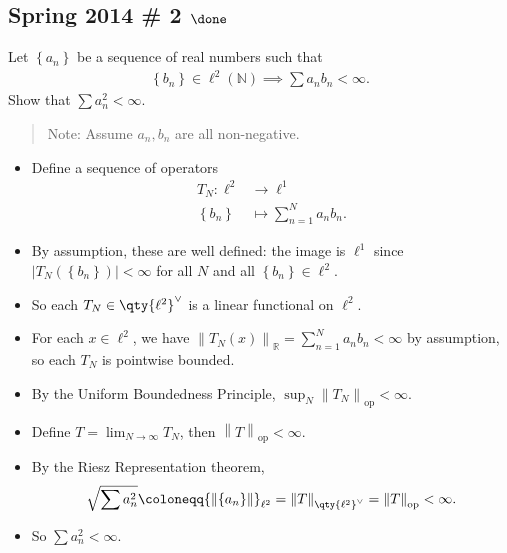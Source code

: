\hypertarget{spring-2014-2-done}{%
\subsection{\texorpdfstring{Spring 2014 \# 2
\(\done\)}{Spring 2014 \# 2 \textbackslash done}}\label{spring-2014-2-done}}

Let \(\left\{{a_n}\right\}\) be a sequence of real numbers such that
\begin{align*}
\left\{{b_n}\right\} \in \ell^2({\mathbb{N}}) \implies \sum a_n b_n < \infty.
\end{align*}
Show that \(\sum a_n^2 < \infty\).

\begin{quote}
Note: Assume \(a_n, b_n\) are all non-negative.
\end{quote}


\begin{solution}

\envlist

\begin{itemize}
\item
  Define a sequence of operators
  \begin{align*}  
  T_N: \ell^2 &\to \ell^1\\
  \left\{{b_n}\right\} &\mapsto \sum_{n=1}^N a_n b_n
  .\end{align*}
\item
  By assumption, these are well defined: the image is \(\ell^1\) since
  \({\left\lvert {T_N(\left\{{b_n}\right\})} \right\rvert} < \infty\)
  for all \(N\) and all \(\left\{{b_n}\right\} \in \ell^2\).
\item
  So each \(T_N \in \qty{\ell^2}^\vee\) is a linear functional on
  \(\ell^2\).
\item
  For each \(x\in \ell^2\), we have
  \({\left\lVert {T_N(x)} \right\rVert}_{{\mathbb{R}}} = \sum_{n=1}^N a_n b_n < \infty\)
  by assumption, so each \(T_N\) is pointwise bounded.
\item
  By the Uniform Boundedness Principle,
  \(\sup_N {\left\lVert {T_N} \right\rVert}_{\text{op}} < \infty\).
\item
  Define \(T = \lim_{N \to\infty } T_N\), then
  \({\left\lVert {T} \right\rVert}_{\text{op}} < \infty\).
\item
  By the Riesz Representation theorem,
  \begin{align*}  
  \sqrt{\sum a_n^2} \coloneqq{\left\lVert {\left\{{a_n}\right\}} \right\rVert}_{\ell^2} = {\left\lVert {T} \right\rVert}_{\qty{\ell^2}^\vee} = {\left\lVert {T} \right\rVert}_{\text{op}} < \infty
  .\end{align*}
\item
  So \(\sum a_n^2 < \infty\).
\end{itemize}

\end{solution}

